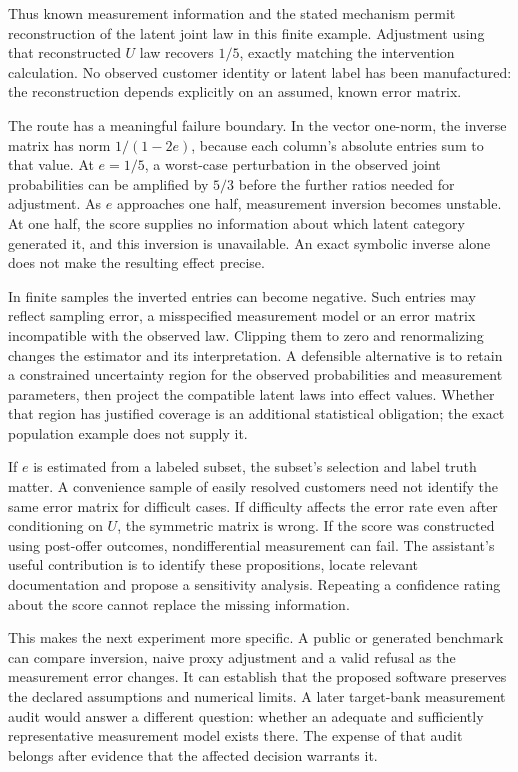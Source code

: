 Thus known measurement information and the stated mechanism permit
reconstruction of the latent joint law in this finite example.
Adjustment using that reconstructed \(U\) law recovers \(1/5\), exactly
matching the intervention calculation. No observed customer identity or
latent label has been manufactured: the reconstruction depends
explicitly on an assumed, known error matrix.
\citep{exec13_diagram_examples}

The route has a meaningful failure boundary. In the vector one-norm, the
inverse matrix has norm \(1/(1-2e)\), because each column's absolute
entries sum to that value. At \(e=1/5\), a worst-case perturbation in
the observed joint probabilities can be amplified by \(5/3\) before the
further ratios needed for adjustment. As \(e\) approaches one half,
measurement inversion becomes unstable. At one half, the score supplies
no information about which latent category generated it, and this
inversion is unavailable. An exact symbolic inverse alone does not make
the resulting effect precise.

In finite samples the inverted entries can become negative. Such entries
may reflect sampling error, a misspecified measurement model or an error
matrix incompatible with the observed law. Clipping them to zero and
renormalizing changes the estimator and its interpretation. A defensible
alternative is to retain a constrained uncertainty region for the
observed probabilities and measurement parameters, then project the
compatible latent laws into effect values. Whether that region has
justified coverage is an additional statistical obligation; the exact
population example does not supply it.

If \(e\) is estimated from a labeled subset, the subset's selection and
label truth matter. A convenience sample of easily resolved customers
need not identify the same error matrix for difficult cases. If
difficulty affects the error rate even after conditioning on \(U\), the
symmetric matrix is wrong. If the score was constructed using post-offer
outcomes, nondifferential measurement can fail. The assistant's useful
contribution is to identify these propositions, locate relevant
documentation and propose a sensitivity analysis. Repeating a confidence
rating about the score cannot replace the missing information.

This makes the next experiment more specific. A public or generated
benchmark can compare inversion, naive proxy adjustment and a valid
refusal as the measurement error changes. It can establish that the
proposed software preserves the declared assumptions and numerical
limits. A later target-bank measurement audit would answer a different
question: whether an adequate and sufficiently representative
measurement model exists there. The expense of that audit belongs after
evidence that the affected decision warrants it.

